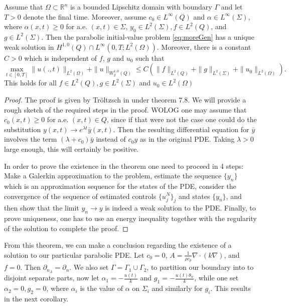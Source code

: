 \begin{theorem} Assume that $\Omega \subset \mathbb{R}^n$ is a bounded Lipschitz domain with boundary $\Gamma$ and let $T>0$ denote the final time. Moreover, assume $c_0 \in L^{\infty}(Q)$ and $\alpha \in L^{\infty}(\Sigma)$, where $\alpha(x,t) \geq 0$ for a.e. $(x,t) \in \Sigma$, $y_0 \in L^2(\Sigma), f \in L^2(Q)$, and $g \in L^2(\Sigma)$. Then the parabolic initial-value problem \eqref{eq:moreGen} has a unique weak solution in $H^{1,0}(Q) \cap L^{\infty}(0,T;L^2(\Omega))$. Moreover, there is a constant $C>0$ which is independent of $f$, $g$ and $u_0$ such that 
\begin{equation*}
    \max_{t \in [0,T]} \|u(.,t)\|_{L^2(\Omega)} + \|u\|_{W_2^{1,0}(Q)} \leq C\left(\|f\|_{L^2(Q)} + \|g\|_{L^2(\Sigma)} + \|u_0\|_{L^2(\Omega)}\right).
\end{equation*}
This holds for all $f \in L^2(Q), g \in L^2(\Sigma)$ and $u_0 \in L^2(\Omega)$
\end{theorem}

\begin{proof}
The proof is given by Tröltzsch in \cite{optimalControl} under theorem 7.8. We will provide a rough sketch of the required steps in the proof. WOLOG one may assume that $c_0(x,t)\geq 0$ for a.e. $(x,t) \in Q$, since if that were not the case one could do the substitution $y(x,t) \rightarrow e^{\lambda t}\bar{y}(x,t)$. Then the resulting differential equation for $\bar{y}$ involves the term $(\lambda + c_0)\bar{y}$ instead of $c_0y$ as in the original PDE. Taking $\lambda >0$ large enough, this will certainly be positive. 

In order to prove the existence in the theorem one need to proceed in 4 steps: Make a Galerkin approximation to the problem, estimate the sequence $\{y_n \}$ which is an approximation sequence for the states of the PDE, consider the convergence of the sequence of estimated controls $\{u_j^N\}_j$ and states $\{ y_n \}$, and then show that the limit $y_n \rightarrow y$ is indeed a weak solution to the PDE. Finally, to prove uniqueness, one has to use an energy inequality together with the regularity of the solution to complete the proof.
\end{proof}


From this theorem, we can make a conclusion regarding the existence of a solution to our particular parabolic PDE. Let $c_0 = 0$, $A = \frac{1}{\rho c_p}\nabla \cdot (k\nabla)$, and $f = 0$. Then $\partial_{n_A} = \partial_n$. We also set $\Gamma = \Gamma_1 \cup \Gamma_2$, to partition our boundary into to disjoint separate parts, now let $\alpha_1 = -\frac{u(t)}{k}$ and $g_1 = -\frac{u(t)\theta_w}{k}$, while one set $\alpha_2 = 0, g_2 = 0$, where $\alpha_i$ is the value of $\alpha$ on $\Sigma_i$ and similarly for $g_i$. This results in the next corollary. 

